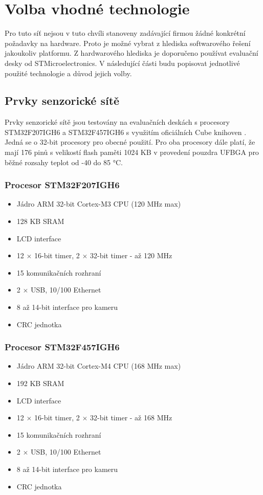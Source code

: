 \chapter{Volba vhodné technologie}
Pro tuto síť nejsou v tuto chvíli stanoveny zadávající firmou žádné konkrétní požadavky na hardware. Proto je možné vybrat z hlediska softwarového řešení jakoukoliv platformu. Z hardwarového hlediska je doporučeno používat evaluační desky od STMicroelectronics. V následující části budu popisovat jednotlivé použité technologie a důvod jejich volby.

\section{Prvky senzorické sítě}
Prvky senzorické sítě jsou testovány na evaluačních deskách s procesory STM32F207IGH6 a STM32F457IGH6 s využitím oficiálních Cube knihoven \cite{cube}. Jedná se o 32-bit procesory pro obecné použití. Pro oba procesory dále platí, že mají 176 pinů s velikostí flash paměti 1024 KB v provedení pouzdra UFBGA pro běžné rozsahy teplot od -40 do 85 °C.

\subsection{Procesor STM32F207IGH6}
\begin{itemize}
\itemsep0em
\item Jádro ARM 32-bit Cortex\texttrademark-M3 CPU (120 MHz max)
\item 128 KB SRAM
\item LCD interface
\item 12 \ensuremath{\times} 16-bit timer, 2 \ensuremath{\times} 32-bit timer - až 120 MHz
\item 15 komunikačních rozhraní
\item 2 \ensuremath{\times} USB, 10/100 Ethernet
\item 8 až 14-bit interface pro kameru
\item CRC jednotka
\end{itemize}

\subsection{Procesor STM32F457IGH6}
\begin{itemize}
\itemsep0em
\item Jádro ARM 32-bit Cortex\texttrademark-M4 CPU (168 MHz max)
\item 192 KB SRAM
\item LCD interface
\item 12 \ensuremath{\times} 16-bit timer, 2 \ensuremath{\times} 32-bit timer - až 168 MHz
\item 15 komunikačních rozhraní
\item 2 \ensuremath{\times} USB, 10/100 Ethernet
\item 8 až 14-bit interface pro kameru
\item CRC jednotka
\end{itemize}

